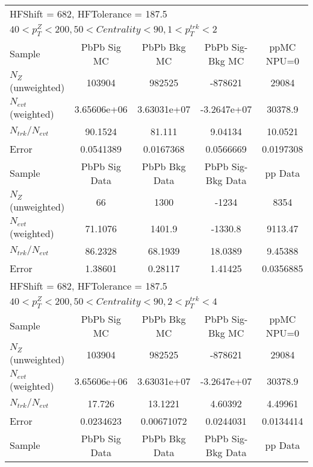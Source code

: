 \clearpage
\begin{table}[h!]
\centering
\begin{tabular}{|l|c|c|c|c|}
\multicolumn{5}{l}{ HFShift = 682, HFTolerance = 187.5}\\
\multicolumn{5}{l}{ $40 < p_{T}^{Z} < 200, 50 < Centrality < 90, 1 < p_{T}^{trk} < 2$}\\
\hline\hline
Sample         & PbPb Sig MC    & PbPb Bkg MC    & PbPb Sig-Bkg MC& ppMC NPU=0     \\
$N_Z$ (unweighted)& 103904         & 982525         & -878621        & 29084          \\
$N_{evt}$ (weighted)& 3.65606e+06    & 3.63031e+07    & -3.2647e+07    & 30378.9        \\
$N_{trk}/N_{evt}$& 90.1524        & 81.111         & 9.04134        & 10.0521        \\
Error          & 0.0541389      & 0.0167368      & 0.0566669      & 0.0197308      \\
\hline
Sample         & PbPb Sig Data  & PbPb Bkg Data  & PbPb Sig-Bkg Data& pp Data  \\
$N_Z$ (unweighted)& 66             & 1300           & -1234          & 8354           \\
$N_{evt}$ (weighted)& 71.1076        & 1401.9         & -1330.8        & 9113.47        \\
$N_{trk}/N_{evt}$& 86.2328        & 68.1939        & 18.0389        & 9.45388        \\
Error          & 1.38601        & 0.28117        & 1.41425        & 0.0356885      \\
\hline\hline
\multicolumn{5}{l}{ HFShift = 682, HFTolerance = 187.5}\\
\multicolumn{5}{l}{ $40 < p_{T}^{Z} < 200, 50 < Centrality < 90, 2 < p_{T}^{trk} < 4$}\\
\hline\hline
Sample         & PbPb Sig MC    & PbPb Bkg MC    & PbPb Sig-Bkg MC& ppMC NPU=0     \\
$N_Z$ (unweighted)& 103904         & 982525         & -878621        & 29084          \\
$N_{evt}$ (weighted)& 3.65606e+06    & 3.63031e+07    & -3.2647e+07    & 30378.9        \\
$N_{trk}/N_{evt}$& 17.726         & 13.1221        & 4.60392        & 4.49961        \\
Error          & 0.0234623      & 0.00671072     & 0.0244031      & 0.0134414      \\
\hline
Sample         & PbPb Sig Data  & PbPb Bkg Data  & PbPb Sig-Bkg Data& pp Data  \\

\end{tabular}
\end{table}
